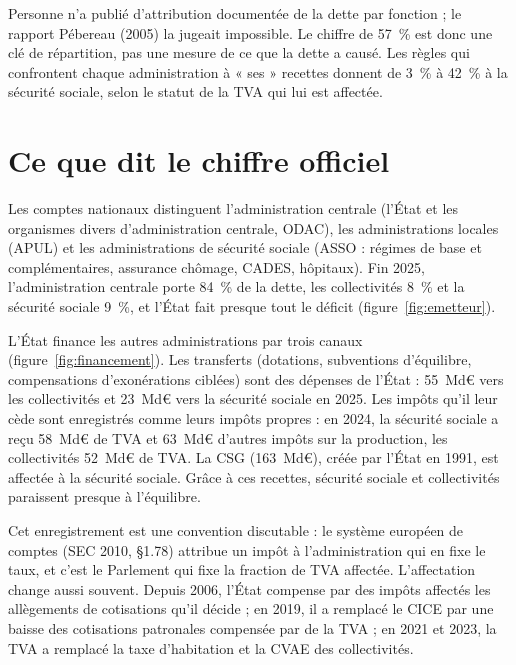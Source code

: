 \documentclass[11pt,a4paper]{article}
\begin{document}
Personne n'a publié d'attribution documentée de la dette par fonction ; le rapport Pébereau (2005)
la jugeait impossible. Le chiffre de 57~\% est donc une clé de répartition, pas une mesure de ce que
la dette a causé. Les règles qui confrontent chaque administration à « ses » recettes donnent de
3~\% à 42~\% à la sécurité sociale, selon le statut de la TVA qui lui est affectée.

\section{Ce que dit le chiffre officiel}\label{sec:officiel}

Les comptes nationaux distinguent l'administration centrale (l'État et les organismes divers
d'administration centrale, ODAC), les administrations locales (APUL) et les administrations de
sécurité sociale (ASSO : régimes de base et complémentaires, assurance chômage, CADES, hôpitaux).
Fin 2025, l'administration centrale porte 84~\% de la dette, les collectivités 8~\% et la sécurité
sociale 9~\%, et l'État fait presque tout le déficit (figure~\ref{fig:emetteur}).


L'État finance les autres administrations par trois canaux (figure~\ref{fig:financement}). Les
transferts (dotations, subventions d'équilibre, compensations d'exonérations ciblées) sont des
dépenses de l'État : 55~Md€ vers les collectivités et 23~Md€ vers la sécurité sociale en 2025. Les
impôts qu'il leur cède sont enregistrés comme leurs impôts propres : en 2024, la sécurité sociale a
reçu 58~Md€ de TVA et 63~Md€ d'autres impôts sur la production, les collectivités 52~Md€ de TVA.
La CSG (163~Md€), créée par l'État en 1991, est affectée à la sécurité sociale. Grâce à ces
recettes, sécurité sociale et collectivités paraissent presque à l'équilibre.


Cet enregistrement est une convention discutable : le système européen de comptes (SEC 2010,
§1.78) attribue un impôt à l'administration qui en fixe le taux, et c'est le Parlement qui fixe la
fraction de TVA affectée. L'affectation change aussi souvent. Depuis 2006, l'État compense par
des impôts affectés les allègements de cotisations qu'il décide ; en 2019, il a remplacé le CICE par
une baisse des cotisations patronales compensée par de la TVA ; en 2021 et 2023, la TVA a remplacé
la taxe d'habitation et la CVAE des collectivités.
\end{document}
